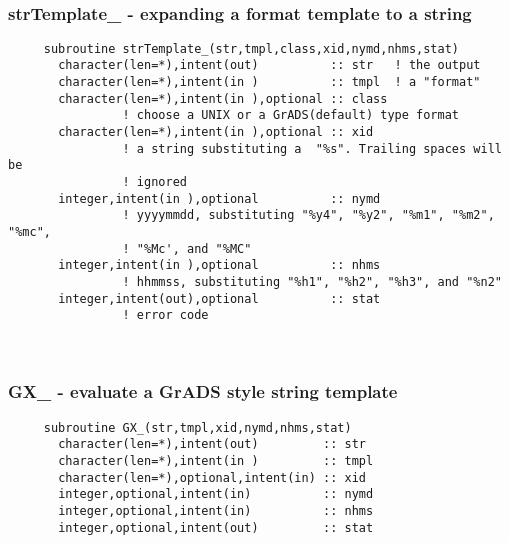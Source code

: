  
\mbox{}\hrulefill\ 

  \subsubsection{strTemplate\_ - expanding a format template to a string}

\begin{verbatim} 
     subroutine strTemplate_(str,tmpl,class,xid,nymd,nhms,stat)
       character(len=*),intent(out)          :: str   ! the output
       character(len=*),intent(in )          :: tmpl  ! a "format"
       character(len=*),intent(in ),optional :: class
                ! choose a UNIX or a GrADS(default) type format
       character(len=*),intent(in ),optional :: xid
                ! a string substituting a  "%s". Trailing spaces will be 
                ! ignored
       integer,intent(in ),optional          :: nymd
                ! yyyymmdd, substituting "%y4", "%y2", "%m1", "%m2", "%mc", 
                ! "%Mc', and "%MC"
       integer,intent(in ),optional          :: nhms
                ! hhmmss, substituting "%h1", "%h2", "%h3", and "%n2"
       integer,intent(out),optional          :: stat
                ! error code
 \end{verbatim}%
 
 
\mbox{}\hrulefill\ 

  \subsubsection{GX\_ - evaluate a GrADS style string template}

\begin{verbatim} 
     subroutine GX_(str,tmpl,xid,nymd,nhms,stat)
       character(len=*),intent(out)         :: str
       character(len=*),intent(in )         :: tmpl
       character(len=*),optional,intent(in) :: xid
       integer,optional,intent(in)          :: nymd
       integer,optional,intent(in)          :: nhms
       integer,optional,intent(out)         :: stat
 \end{verbatim}%


